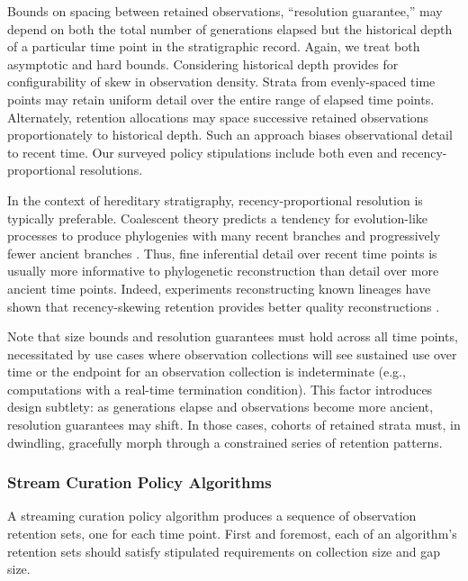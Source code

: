Bounds on spacing between retained observations, ``resolution guarantee,'' may depend on both the total number of generations elapsed but the historical depth of a particular time point in the stratigraphic record.
Again, we treat both asymptotic and hard bounds.
Considering historical depth provides for configurability of skew in observation density.
Strata from evenly-spaced time points may retain uniform detail over the entire range of elapsed time points.
Alternately, retention allocations may space successive retained observations proportionately to historical depth.
Such an approach biases observational detail to recent time.
Our surveyed policy stipulations include both even and recency-proportional resolutions.

In the context of hereditary stratigraphy, recency-proportional resolution is typically preferable.
Coalescent theory predicts a tendency for evolution-like processes to produce phylogenies with many recent branches and progressively fewer ancient branches \citep{nordborgCoalescentTheory2019, berestyckiRecentProgressCoalescent2009}.
Thus, fine inferential detail over recent time points is usually more informative to phylogenetic reconstruction than detail over more ancient time points.
Indeed, experiments reconstructing known lineages have shown that recency-skewing retention provides better quality reconstructions \citep{moreno2022hereditary}.

Note that size bounds and resolution guarantees must hold across all time points, necessitated by use cases where observation collections will see sustained use over time or the endpoint for an observation collection is indeterminate (e.g., computations with a real-time termination condition).
This factor introduces design subtlety: as generations elapse and observations become more ancient, resolution guarantees may shift.
In those cases, cohorts of retained strata must, in dwindling, gracefully morph through a constrained series of retention patterns.

\subsubsection{Stream Curation Policy Algorithms}

A streaming curation policy algorithm produces a sequence of observation retention sets, one for each time point.
First and foremost, each of an algorithm's retention sets should satisfy stipulated requirements on collection size and gap size.

